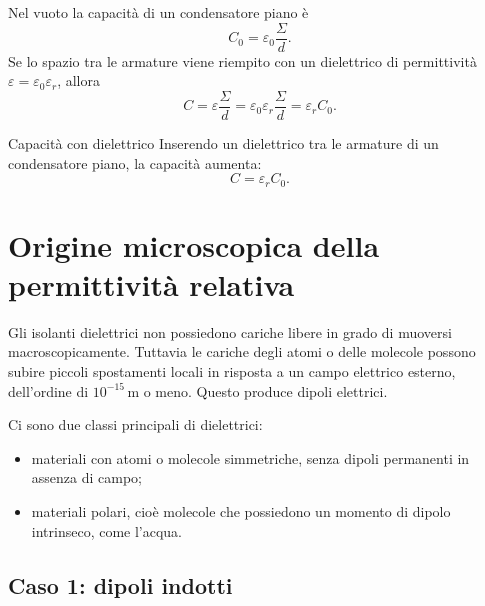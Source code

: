 \documentclass[a4paper]{article}
\begin{document}
Nel vuoto la capacità di un condensatore piano è
\[
    C_0=\varepsilon_0\frac{\Sigma}{d}.
\]
Se lo spazio tra le armature viene riempito con un dielettrico di permittività \(\varepsilon=\varepsilon_0\varepsilon_r\), allora
\[
    C=\varepsilon\frac{\Sigma}{d}
    =\varepsilon_0\varepsilon_r\frac{\Sigma}{d}
    =\varepsilon_r C_0.
\]

\begin{snippetproposition}{Capacità con dielettrico}
    Inserendo un dielettrico tra le armature di un condensatore piano, la capacità aumenta:
    \[
        C=\varepsilon_r C_0.
    \]
\end{snippetproposition}

\begin{center}
\end{center}

\section{Origine microscopica della permittività relativa}

Gli isolanti dielettrici non possiedono cariche libere in grado di muoversi macroscopicamente. Tuttavia le cariche degli atomi o delle molecole possono subire piccoli spostamenti locali in risposta a un campo elettrico esterno, dell'ordine di \(10^{-15}\,\mathrm{m}\) o meno. Questo produce dipoli elettrici.

Ci sono due classi principali di dielettrici:
\begin{itemize}
    \item materiali con atomi o molecole simmetriche, senza dipoli permanenti in assenza di campo;
    \item materiali polari, cioè molecole che possiedono un momento di dipolo intrinseco, come l'acqua.
\end{itemize}

\subsection{Caso 1: dipoli indotti}
\end{document}
